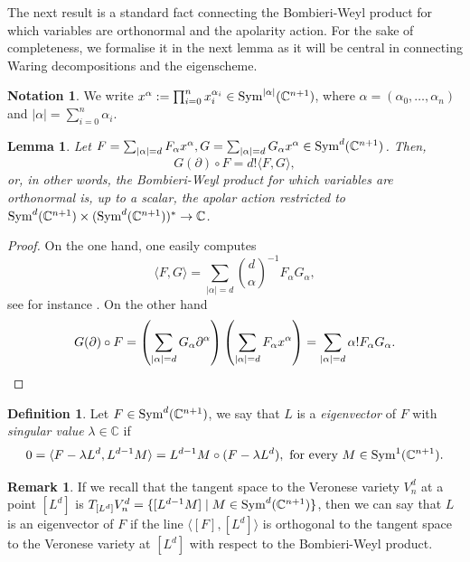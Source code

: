 \documentclass{amsart}
\numberwithin{theorem}{section}
\newtheorem{lemma}[theorem]{Lemma}
\theoremstyle{definition}
\newtheorem{definition}[theorem]{Definition}
\newtheorem{remark}[theorem]{Remark}
\newtheorem{notation}[theorem]{Notation}
\newcommand{\CC}{\mathbb{C}}
\newcommand{\sym}{\mathop{\rm Sym}\nolimits}
\begin{document}
The next result is a standard fact connecting the Bombieri-Weyl product for which variables are orthonormal and the apolarity action. For the sake of completeness, we formalise it in the next lemma as it will be central in connecting Waring decompositions and the eigenscheme. 

\begin{notation}
    We write $x^\alpha := \prod_{i=0}^n x_i^{\alpha_i} \in\sym^{|\alpha|}(\CC^{n+1})$, where $\alpha=(\alpha_0,\dots,\alpha_n)$ and $|\alpha|=\sum_{i=0}^n\alpha_i$.
\end{notation}

\begin{lemma}
    Let $F=\sum_{|\alpha|=d}F_\alpha x^\alpha,G=\sum_{|\alpha|=d}G_\alpha x^\alpha\in \sym^d(\CC^{n+1})$. Then, $$
    G(\partial)\circ F=d!\langle F,G\rangle,
    $$ or, in other words, the Bombieri-Weyl product for which variables are orthonormal is, up to a scalar, the apolar action restricted to $\sym^d(\CC^{n+1})\times (\sym^d(\CC^{n+1}))^\ast\to \CC$.
\end{lemma}

\begin{proof} On the one hand, one easily computes
$$\langle F,G \rangle=\sum_{|\alpha|=d} \binom{d}{\alpha}^{-1}F_\alpha G_\alpha,$$
see for instance \cite[Equation 1.4]{Reznick}. On the other hand 
\begin{equation*}
G(\partial) \circ F=\left(\sum_{|\alpha|=d} G_\alpha \partial^\alpha\right)\left(\sum_{|\alpha|=d} F_\alpha x^\alpha\right)=\sum_{|\alpha|=d} \alpha!F_\alpha G_\alpha.\qedhere
\end{equation*}   
\end{proof}

\begin{definition}
    Let $F\in \sym^d(\CC^{n+1})$, we say that $L$ is a \emph{eigenvector} of $F$ with \emph{singular value} $\lambda\in\CC$ if $$0 = \langle F-\lambda L^d,L^{d-1}M\rangle= L^{d-1}M\circ(F-\lambda L^d),\ \text{for every $M\in\sym^1(\CC^{n+1})$}.$$  
\end{definition}

\begin{remark}\label{rmk:tangent}
    If we recall that the tangent space to the Veronese variety $V_n^d$ at a point $[L^d]$ is $T_{[L^d]}V_n^d = \{[L^{d-1}M] \mid M \in \sym^d(\CC^{n+1})\}$, then we can say that $L$ is an eigenvector of $F$ if the line $\langle [F],[L^d] \rangle$ is orthogonal to the tangent space to the Veronese variety at $[L^d]$ with respect to the Bombieri-Weyl product. 
\end{remark}
\end{document}
